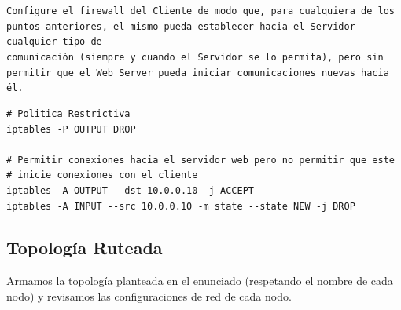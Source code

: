 \texttt{Configure el firewall del Cliente de modo que, para cualquiera de los puntos anteriores, el mismo pueda establecer hacia el Servidor cualquier tipo de \\comunicación (siempre y cuando el Servidor se lo permita), pero sin permitir que el Web Server pueda iniciar comunicaciones nuevas hacia él.}

\begin{lstlisting}
# Politica Restrictiva
iptables -P OUTPUT DROP

# Permitir conexiones hacia el servidor web pero no permitir que este
# inicie conexiones con el cliente
iptables -A OUTPUT --dst 10.0.0.10 -j ACCEPT
iptables -A INPUT --src 10.0.0.10 -m state --state NEW -j DROP
\end{lstlisting}

\subsection*{Topología Ruteada}

Armamos la topología planteada en el enunciado (respetando el nombre de cada nodo) y revisamos las configuraciones de red de cada nodo. 

